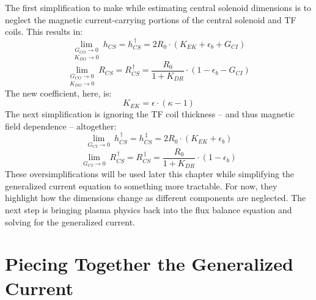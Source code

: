 The first simplification to make while estimating central solenoid dimensions is to neglect the magnetic current-carrying portions of the central solenoid and TF coils. This results in:
\begin{equation}
	\underset{K_{DO} \to 0}{\underset{G_{CO} \to 0}{\lim}} \ h_{CS} = h_{CS}^{\,\dagger} = 2 R_0 \cdot \left( K_{EK} + \epsilon_b + G_{CI} \right) 
\end{equation}
\begin{equation}
	\underset{K_{DO} \to 0}{\underset{G_{CO} \to 0}{\lim}} \ R_{CS} = R_{CS}^{\,\dagger} = \frac{ R_0 }{ 1 + K_{DR} } \cdot \left( 1 - \epsilon_b - G_{CI}  \right)
\end{equation}
The new  coefficient, here, is:
\begin{equation}
	K_{EK} = \epsilon \cdot \left( \kappa - 1 \right)
\end{equation}
The next simplification is ignoring the TF coil thickness -- and thus magnetic field dependence -- altogether:
\begin{equation}
	\label{eq:hcs_simple}
	\underset{G_{CI} \to 0}{\lim} \ h_{CS}^{\,\dagger} = h_{CS}^{\,\ddagger} = 2 R_0 \cdot \left( K_{EK} + \epsilon_b \right) 
\end{equation}
\begin{equation}
	\label{eq:rcs_simple}
	\underset{G_{CI} \to 0}{\lim} \ R_{CS}^{\,\dagger} = R_{CS}^{\,\ddagger} = \frac{ R_0 }{ 1 + K_{DR} } \cdot \left( 1 - \epsilon_b  \right)
\end{equation}
These oversimplifications will be used later this chapter while simplifying the generalized current equation to something more tractable. For now, they highlight how the dimensions change as different components are neglected. The next step is bringing plasma physics back into the flux balance equation and solving for the generalized current.

\section{Piecing Together the Generalized Current}


